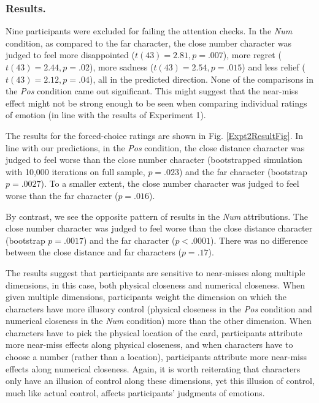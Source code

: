 \documentclass[10pt,letterpaper]{article}
\begin{document}
\subsubsection{Results.} Nine participants were excluded for failing the attention checks. In the \textit{Num} condition, as compared to the far character, the close number character was judged to feel more disappointed ($t(43)=2.81, p=.007$), more regret ($t(43)=2.44, p=.02$), more sadness ($t(43)=2.54, p=.015$) and less relief ($t(43)=2.12, p=.04$), all in the predicted direction. None of the comparisons in the \textit{Pos} condition came out significant. This might suggest that the near-miss effect might not be strong enough to be seen when comparing individual ratings of emotion (in line with the results of Experiment 1).


The results for the forced-choice ratings are shown in Fig. \ref{Expt2ResultFig}. In line with our predictions, in the \textit{Pos} condition, the close distance character was judged to feel worse than the close number character (bootstrapped simulation with 10,000 iterations on full sample, $p=.023$) and the far character (bootstrap $p=.0027$). To a smaller extent, the close number character was judged to feel worse than the far character ($p=.016$). 

By contrast, we see the opposite pattern of results in the \textit{Num} attributions. The close number character was judged to feel worse than the close distance character (bootstrap $p=.0017$) and the far character ($p<.0001$). There was no difference between the close distance and far characters ($p=.17$). 


The results suggest that participants are sensitive to near-misses along multiple dimensions, in this case, both physical closeness and numerical closeness. When given multiple dimensions, participants weight the dimension on which the characters have more illusory control (physical closeness in the \textit{Pos} condition and numerical closeness in the \textit{Num} condition) more than the other dimension. When characters have to pick the physical location of the card, participants attribute more near-miss effects along physical closeness, and when characters have to choose a number (rather than a location), participants attribute more near-miss effects along numerical closeness. Again, it is worth reiterating that characters only have an illusion of control along these dimensions, yet this illusion of control, much like actual control, affects participants' judgments of emotions.
\end{document}
